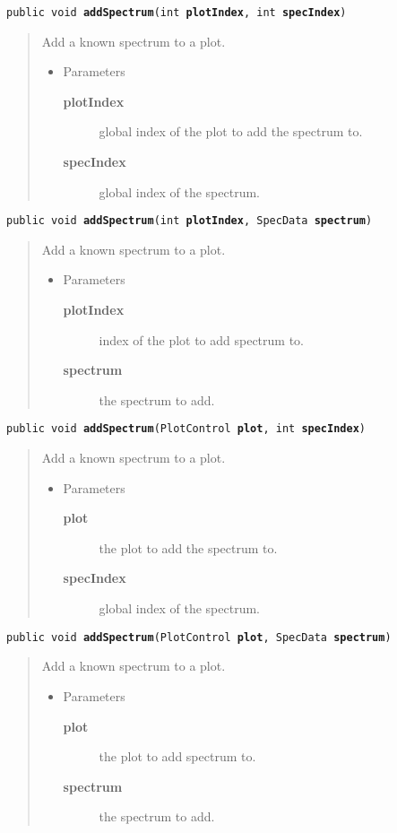 \documentclass[twoside,11pt,nolof]{starlink}
\providecommand{\method}[1]{\texttt{#1}}
\newenvironment{desc}{\begin{quote}}{\end{quote}}
\begin{document}
\method{public void \textbf{addSpectrum}(\texttt{int} \textbf{plotIndex},
\texttt{int} \textbf{specIndex})\label{l271}\label{l272}}
\begin{desc}Add a known spectrum to a plot.
\begin{itemize}
\item{Parameters
  \begin{description}
   \item[\textbf{plotIndex}]{global index of the plot to add the spectrum to.}
   \item[\textbf{specIndex}]{global index of the spectrum.}
  \end{description}}
\end{itemize}
\end{desc}

\method{public void \textbf{addSpectrum}(\texttt{int} \textbf{plotIndex},
\texttt{SpecData} \textbf{spectrum})\label{l273}\label{l274}}
\begin{desc}Add a known spectrum to a plot.
\begin{itemize}
\item{Parameters
  \begin{description}
   \item[\textbf{plotIndex}]{index of the plot to add spectrum to.}
   \item[\textbf{spectrum}]{the spectrum to add.}
  \end{description}}
\end{itemize}
\end{desc}

\method{public void \textbf{addSpectrum}(\texttt{PlotControl} \textbf{plot}, \texttt{int} \textbf{specIndex})\label{l275}\label{l276}}
\begin{desc}Add a known spectrum to a plot.
\begin{itemize}
\item{Parameters
  \begin{description}
   \item[\textbf{plot}]{the plot to add the spectrum to.}
   \item[\textbf{specIndex}]{global index of the spectrum.}
  \end{description}}
\end{itemize}
\end{desc}

\method{public void \textbf{addSpectrum}(\texttt{PlotControl} \textbf{plot}, \texttt{SpecData} \textbf{spectrum})\label{l277}\label{l278}}
\begin{desc}Add a known spectrum to a plot.
\begin{itemize}
\item{Parameters
  \begin{description}
   \item[\textbf{plot}]{the plot to add spectrum to.}
   \item[\textbf{spectrum}]{the spectrum to add.}
  \end{description}}
\end{itemize}
\end{desc}
\end{document}
